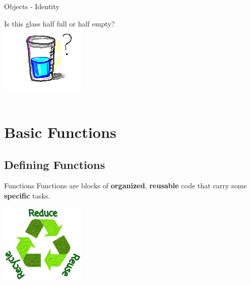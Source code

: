     \begin{frame}{Objects - Identity}
        \begin{center}
            \Large
            Is this glass half full or half empty?
            \\
            \includegraphics[width=0.30\textwidth]{Lecture2/images/glass.png}
            \pause
            \inputminted[frame=single,framesep=2pt, firstline=6]{python3}{code-examples/identity.py}
            \pause
        \end{center}
    \end{frame}

    \section{Basic Functions}
        \subsection{Defining Functions}
        \begin{frame}[c]{Functions}
            \LARGE
            Functions are blocks of
            \pause
            \textbf{organized},
            \pause
            \textbf{reusable} code
            \pause that carry some \textbf{specific} tasks.\\
            \pause
            \begin{center}
                \includegraphics[width=0.3\textwidth]{Lecture2/images/reduce_reuse_recycle.png}
            \end{center}
        \end{frame}

